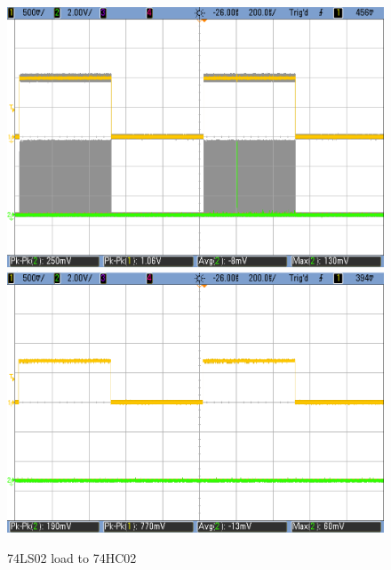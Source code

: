 \begin{figure}[h!]
        \includegraphics[scale=0.19]{LS-HC-1V.png}\\
        \vspace{0.2cm}
        \includegraphics[scale=0.19]{LS-HC-0p7V.png}
        \caption{\color{cyan}74LS02 load to 74HC02}
        \label{fig:ej2exlstohc}
    \end{figure}
    
